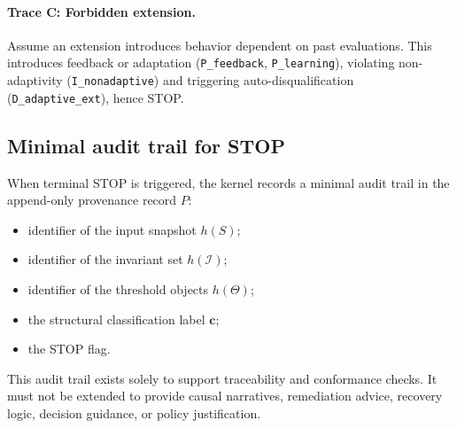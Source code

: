 \paragraph{Trace C: Forbidden extension.}
Assume an extension introduces behavior dependent on past evaluations.
This introduces feedback or adaptation (\texttt{P\_feedback},
\texttt{P\_learning}), violating non-adaptivity (\texttt{I\_nonadaptive}) and
triggering auto-disqualification (\texttt{D\_adaptive\_ext}), hence STOP.

\subsection{Minimal audit trail for STOP}

When terminal STOP is triggered, the kernel records a minimal audit trail
in the append-only provenance record $P$:
\begin{itemize}
  \item identifier of the input snapshot $h(S)$;
  \item identifier of the invariant set $h(\mathcal{I})$;
  \item identifier of the threshold objects $h(\Theta)$;
  \item the structural classification label $\mathbf{c}$;
  \item the STOP flag.
\end{itemize}

This audit trail exists solely to support traceability and
conformance checks.
It must not be extended to provide causal narratives,
remediation advice, recovery logic, decision guidance,
or policy justification.
